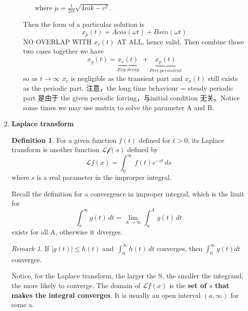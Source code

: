 \documentclass[9pt]{article}
\theoremstyle{definition}
\newtheorem{definition}{Definition}
\newenvironment{changemargin}[2]{%
  \begin{list}{}{%
    \setlength{\topsep}{0pt}%
    \setlength{\leftmargin}{#1}%
    \setlength{\rightmargin}{#2}%
    \setlength{\listparindent}{\parindent}%
    \setlength{\itemindent}{\parindent}%
    \setlength{\parsep}{\parskip}%
  }%
  \item[]}{\end{list}}
\theoremstyle{theorem}
\theoremstyle{remark}
\newtheorem{remark}{Remark}
\theoremstyle{lemma}
\begin{document}
\begin{changemargin}{-0.125in}{0in}
\begin{enumerate}
\begin{enumerate}
\begin{itemize}
            where $\mu = \frac{1}{2m} \sqrt{4mk - c^2}$.
        \end{itemize}
        Then the form of a particular solution is 
        \[
        x_p(t) = Acos(\omega t) + Bsin(\omega t)
        \]
        NO OVERLAP WITH $x_c(t)$ AT ALL, hence valid. Then combine those two cases together we have 
        \[
        x_g(t) = \underbrace{x_c(t)}_{Exp. decay} \,\,+ \underbrace{x_p(t)}_{Peri. persistent}
        \]
        so as $t \rightarrow \infty$ $x_c$ is negligible as the transient part and $x_p(t)$ still exists as the periodic part. 注意，the long time behaviour = steady periodic part 是由于 the given periodic forcing，与initial condition 无关。Notice some times we may use matrix to solve the parameter A and B.
        \end{enumerate}
        
        \medskip
        
        \item \textbf{Laplace transform} 
        
        \medskip
        
        \begin{definition}
        	For a given function $f(t)$ defined for $t > 0$, its Laplace transform is another function $\mathcal{Lf}(s)$ defined by
        	\[
        	\mathcal{L}f(x) = \int^\infty_0\,f(t)e^{-st}\,ds
        	\]
        	where $s$ is a real parameter in the improrper integral.
        \end{definition}
        
        Recall the definition for a convergence in improper integral, which is the limit for 
        \[
        \int^\infty_a g(t) \,dt =  \lim_{A \rightarrow \infty} \int ^A_a \, g(t) \,dt
        \]
        exists for all A, otherwise it diverges. 
        
        \smallskip
        \theoremstyle{Remark}
        \begin{remark}
        	If $|g(t)| \leq h(t)$ and $\,\int_0^\infty h(t)\,dt $ converges, then $\int_0^\infty g(t) dt$ converges.
        \end{remark}
        
        \medskip 
        
        Notice, for the Laplace transform, the larger the S, the smaller the integrand, the more likely to converge. The domain of $\mathcal{L}f(x)$ is the \textbf{set of $s$ that makes the integral converges}. It is usually an open interval $(a, \infty)$ for some a. 
        

\end{enumerate}
\end{changemargin}
\end{document}
